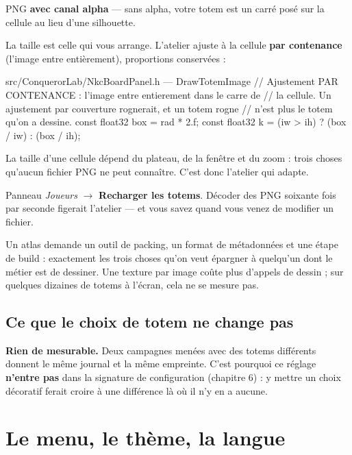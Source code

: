 PNG \textbf{avec canal alpha} — sans alpha, votre totem est un carré posé sur la
cellule au lieu d'une silhouette.

La taille est celle qui vous arrange. L'atelier ajuste à la cellule \textbf{par
contenance} (l'image entre entièrement), proportions conservées :

\begin{nkcode}{src/ConquerorLab/NkcBoardPanel.h — DrawTotemImage}
// Ajustement PAR CONTENANCE : l'image entre entierement dans le carre de
// la cellule. Un ajustement par couverture rognerait, et un totem rogne
// n'est plus le totem qu'on a dessine.
const float32 box = rad * 2.f;
const float32 k   = (iw > ih) ? (box / iw) : (box / ih);
\end{nkcode}

La taille d'une cellule dépend du plateau, de la fenêtre et du zoom : trois
choses qu'aucun fichier PNG ne peut connaître. C'est donc l'atelier qui adapte.

\begin{nkpiege}
Panneau \emph{Joueurs} $\rightarrow$ \textbf{Recharger les totems}. Décoder des
PNG soixante fois par seconde figerait l'atelier — et vous savez quand vous venez
de modifier un fichier.
\end{nkpiege}

\begin{nkretenir}
Un atlas demande un outil de packing, un format de métadonnées et une étape de
build : exactement les trois choses qu'on veut épargner à quelqu'un dont le
métier est de dessiner. Une texture par image coûte plus d'appels de dessin ; sur
quelques dizaines de totems à l'écran, cela ne se mesure pas.
\end{nkretenir}

\subsection{Ce que le choix de totem ne change pas}

\textbf{Rien de mesurable.} Deux campagnes menées avec des totems différents
donnent le même journal et la même empreinte. C'est pourquoi ce réglage
\textbf{n'entre pas} dans la signature de configuration (chapitre 6) : y mettre un
choix décoratif ferait croire à une différence là où il n'y en a aucune.

\section{Le menu, le thème, la langue}

